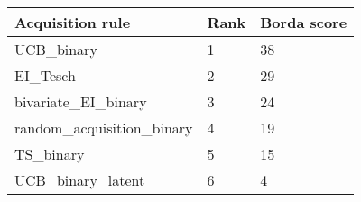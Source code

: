 \begin{tabular}{lll}
Acquisition rule & Rank & Borda score \\ 
\hline 
UCB_binary                & 1 & 38 \\ 
EI_Tesch                  & 2 & 29 \\ 
bivariate_EI_binary       & 3 & 24 \\ 
random_acquisition_binary & 4 & 19 \\ 
TS_binary                 & 5 & 15 \\ 
UCB_binary_latent         & 6 & 4 \\ 
\hline 
\end{tabular}